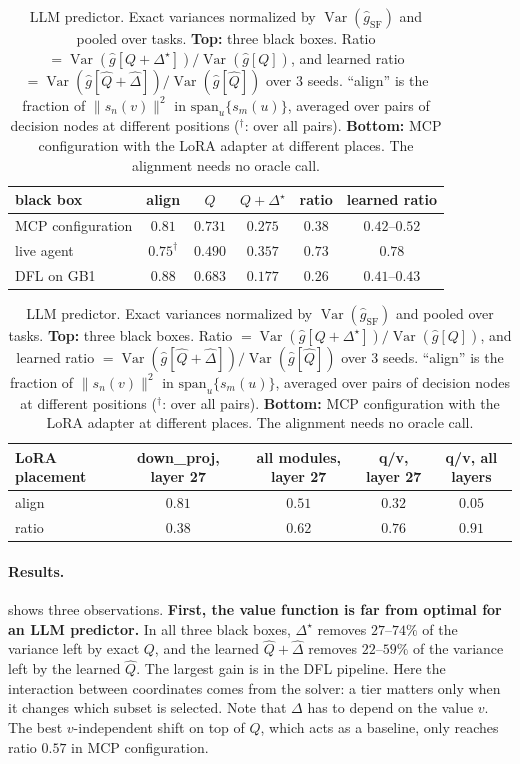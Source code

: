 \documentclass[10pt]{article}
\providecommand{\Var}{\operatorname{Var}}
\theoremstyle{plain}
\theoremstyle{definition}
\theoremstyle{remark}
\theoremstyle{definition}
\newcommand{\score}[1]{s_{#1}}               %
\newcommand{\ghat}[1]{\hat g[#1]}            %
\newcommand{\rf}{\hat g_{\mathrm{SF}}}       %
\newcommand{\Dstar}{\Delta^{\star}}
\begin{document}
\begin{table}[t]
\centering\small
\caption{LLM predictor. Exact variances normalized by $\Var(\rf)$ and pooled over tasks. \textbf{Top:} three black boxes. Ratio $=\Var(\ghat{Q+\Dstar})/\Var(\ghat{Q})$, and learned ratio $=\Var(\ghat{\hat Q+\hat\Delta})/\Var(\ghat{\hat Q})$ over $3$ seeds. ``align'' is the fraction of $\|\score{n}(v)\|^2$ in $\mathrm{span}_u\{\score{m}(u)\}$, averaged over pairs of decision nodes at different positions ($^{\dagger}$: over all pairs). \textbf{Bottom:} MCP configuration with the LoRA adapter at different places. The alignment needs no oracle call.}
\label{tab:mcp}
\begin{tabular}{lccccc}
\toprule
black box & align & $Q$ & $Q{+}\Dstar$ & ratio & learned ratio \\
\midrule
MCP configuration & $0.81$ & $0.731$ & $0.275$ & $0.38$ & $0.42$--$0.52$ \\
live agent & $0.75^{\dagger}$ & $0.490$ & $0.357$ & $0.73$ & $0.78$ \\
DFL on GB1 & $0.88$ & $0.683$ & $0.177$ & $\mathbf{0.26}$ & $0.41$--$0.43$ \\
\bottomrule
\end{tabular}

\vspace{0.8em}
\begin{tabular}{lcccc}
\toprule
LoRA placement & down\_proj, layer 27 & all modules, layer 27 & q/v, layer 27 & q/v, all layers \\
\midrule
align & $0.81$ & $0.51$ & $0.32$ & $0.05$ \\
ratio & $0.38$ & $0.62$ & $0.76$ & $0.91$ \\
\bottomrule
\end{tabular}
\end{table}

\paragraph{Results.}  shows three observations. \textbf{First, the value function is far from optimal for an LLM predictor.} In all three black boxes, $\Dstar$ removes $27$--$74\%$ of the variance left by exact $Q$, and the learned $\hat Q{+}\hat\Delta$ removes $22$--$59\%$ of the variance left by the learned $\hat Q$. The largest gain is in the DFL pipeline. Here the interaction between coordinates comes from the solver: a tier matters only when it changes which subset is selected. Note that $\Delta$ has to depend on the value $v$. The best $v$-independent shift on top of $Q$, which acts as a baseline, only reaches ratio $0.57$ in MCP configuration.
\end{document}
